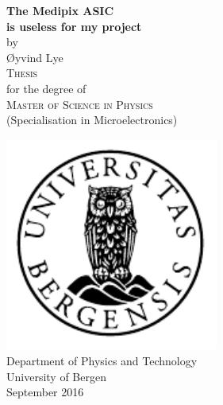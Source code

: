 \documentclass[12pt, a4paper]{report}
\begin{document}
\maketitle

\newcommand{\blankpage}{\newpage{}\thispagestyle{empty}\mbox{}\newpage{}}
\newcommand{\HRule}{\rule{\linewidth}{0.5mm}}

\begin{titlepage}
\begin{center}
{ \Huge \bfseries The Medipix ASIC\\is useless for my project}\\[1cm]

\large by\\ \Large Øyvind Lye\\[1.6cm]

\textsc{\Large Thesis}\\
\large for the degree of\\
\textsc{\Large Master of Science in Physics}\\[0.5cm]
\large (Specialisation in Microelectronics) \\[0.5cm]


\end{center}
\vfill
\begin{center}
{
	\includegraphics[width=7cm]{uib-emblem-svart}\\[0.5cm]
	
	\large {Department of Physics and Technology}\\
	\large {University of Bergen}\\[1cm]
	September 2016}
\end{center}
\end{titlepage}
\end{document}
